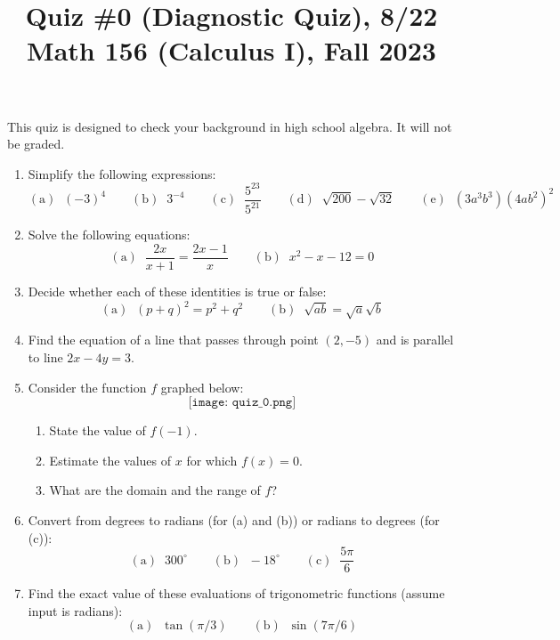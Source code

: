 \documentclass[11pt]{article}
\title{Quiz \#0 (Diagnostic Quiz), 8/22 \\ Math 156 (Calculus I), Fall 2023}
\date{}
\begin{document}
\maketitle

\thispagestyle{empty}

\vspace{-1cm}

This quiz is designed to check your background in high school algebra. It will not be graded.

\begin{enumerate}
\item Simplify the following expressions:
\[ \mathrm{(a)} \; \; (-3)^4 \qquad \mathrm{(b)} \; \; 3^{-4} \qquad \mathrm{(c)} \; \; \frac{5^{23}}{5^{21}} \qquad \mathrm{(d)} \; \; \sqrt{200}-\sqrt{32} \qquad \mathrm{(e)} \; \; (3a^3b^3)(4ab^2)^2 \]
\item Solve the following equations:
\[ \mathrm{(a)} \; \; \frac{2x}{x+1} = \frac{2x-1}{x} \qquad \mathrm{(b)} \; \; x^2 - x -12 = 0\]
\item Decide whether each of these identities is true or false:
\[ \mathrm{(a)} \; \; (p+q)^2 = p^2 + q^2 \qquad \mathrm{(b)} \; \; \sqrt{ab} = \sqrt{a}\sqrt{b}  \]
\item Find the equation of a line that passes through point $(2,-5)$ and is parallel to line $2x-4y=3$.

\item Consider the function $f$ graphed below:
\[ \texttt{[image: quiz\_0.png]} \]
\begin{enumerate}
\item State the value of $f(-1)$.
\item Estimate the values of $x$ for which $f(x)=0$.
\item What are the domain and the range of $f$?
\end{enumerate}

\item Convert from degrees to radians (for (a) and (b)) or radians to degrees (for (c)):
\[ \mathrm{(a)} \; \; 300^{\circ} \qquad \mathrm{(b)} \; \; -18^{\circ} \qquad \mathrm{(c)} \; \; \frac{5\pi}{6}\]

\item Find the exact value of these evaluations of trigonometric functions (assume input is radians):
\[ \mathrm{(a)} \; \; \tan(\pi/3) \qquad \mathrm{(b)} \; \; \sin(7\pi/6)\]

\end{enumerate}
\end{document}
